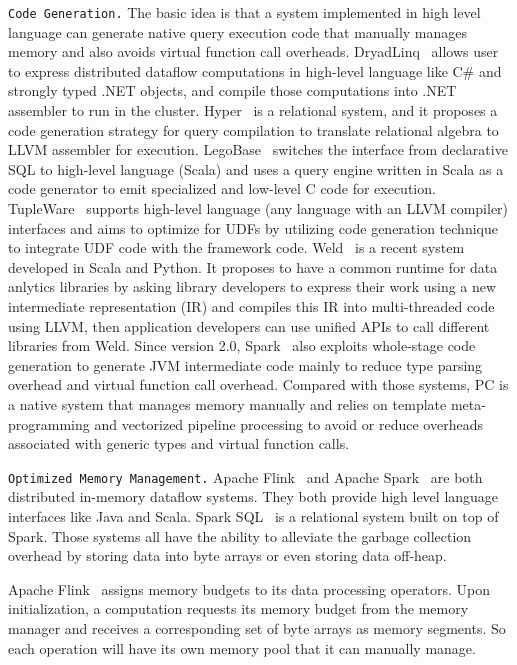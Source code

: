 \vspace{5pt}
\texttt{Code Generation.} The basic idea is that a system implemented in high level language
can generate native query execution code that manually manages
memory and also avoids virtual function call
overheads. DryadLinq~\cite{yu2008dryadlinq} allows user to express distributed dataflow
computations in high-level language like C\# and strongly typed .NET
objects, and compile those computations into .NET assembler to run in
the cluster. Hyper~\cite{neumann2011efficiently} is a relational system,
and it proposes a code
generation strategy for query compilation to translate relational
algebra to LLVM assembler for execution.  LegoBase~\cite{klonatos2014building} switches the interface
from declarative SQL to high-level language (Scala) and uses a query engine
written in Scala as a code generator to emit specialized and low-level
C code for execution. TupleWare~\cite{crotty2015tupleware} supports
high-level language (any language with an LLVM compiler) interfaces
and aims to
optimize for UDFs by utilizing code
generation technique to integrate UDF code with the framework
code. 
Weld~\cite{palkar2017weld} is a recent system developed in Scala and
Python. It proposes
to have a common runtime for data anlytics libraries by asking library
developers to express their work using a new intermediate
representation (IR) and compiles this IR into multi-threaded code using
LLVM, then application developers can use unified APIs to
call different libraries from Weld. Since version 2.0, Spark~\cite{zaharia2012resilient}
also exploits whole-stage code generation to generate JVM intermediate
code mainly to reduce type parsing overhead and virtual function call
overhead. Compared with those systems, PC is a native system that
manages memory manually and
relies on template meta-programming and vectorized pipeline processing
to avoid or reduce overheads associated with generic types and virtual
function calls.

\vspace{5pt}
\texttt {Optimized Memory Management.} 
Apache Flink~\cite{alexandrov2014stratosphere} and Apache
Spark~\cite{zaharia2012resilient} are both distributed in-memory
dataflow systems. They both provide high level language interfaces like Java and Scala.
Spark SQL~\cite{armbrust2015spark} is a relational system built on top
of Spark. Those systems all have the
ability to alleviate the garbage collection overhead  by storing data
into byte arrays or even storing data off-heap.

Apache Flink~\cite{alexandrov2014stratosphere} assigns memory budgets to its data processing operators. Upon
initialization, a computation requests its memory budget from the
memory manager and receives a corresponding set of byte arrays as memory segments. So
each operation will have its own memory pool that it can manually
manage. 

